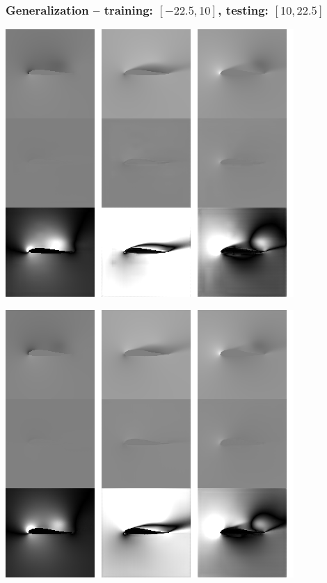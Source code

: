 \begin{frame}
    \frametitle{Generalization -- training: $[-22.5, 10]$, testing: $[10, 22.5]$}
    \vspace*{.1cm}
\begin{multicols}{2}
	
	\includegraphics[width=.9\columnwidth, height=.6\textheight]{./Ressourcen/Praesentation/Bilder/TransferEval/interpolation/right_test/0019_bw.png}%
    \vfill\columnbreak
    
    \includegraphics[width=.9\columnwidth, height=.6\textheight]{./Ressourcen/Praesentation/Bilder/TransferEval/interpolation/right_test/0058_bw.png}%
\end{multicols}
    
\end{frame}
\clearpage

